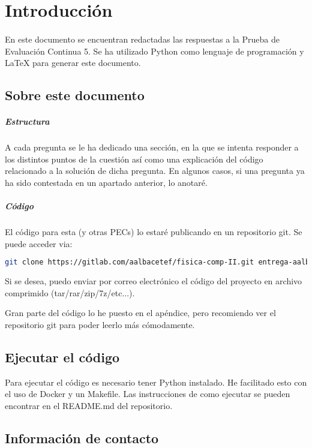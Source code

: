 %
%

\section{Introducción}

\paragraph{}
En este documento se encuentran redactadas las respuestas a la Prueba de Evaluación Continua 5. Se ha utilizado Python como lenguaje de programación y LaTeX para generar este documento.

\subsection{Sobre este documento}

\subparagraph{Estructura}
A cada pregunta se le ha dedicado una sección, en la que se intenta responder a los distintos puntos de la cuestión así como una explicación del código relacionado a la solución de dicha pregunta. En algunos casos, si una pregunta ya ha sido contestada en un apartado anterior, lo anotaré. 

\subparagraph{Código}
El código para esta (y otras PECs) lo estaré publicando en un repositorio git. Se puede acceder via:

\begin{lstlisting}[language=bash]
	git clone https://gitlab.com/aalbacetef/fisica-comp-II.git entrega-aalbacetef-fc-ii
\end{lstlisting}


Si se desea, puedo enviar por correo electrónico el código del proyecto en archivo comprimido (tar/rar/zip/7z/etc...).

Gran parte del código lo he puesto en el apéndice, pero recomiendo ver el repositorio git para poder leerlo más cómodamente.


\subsection{Ejecutar el código}

Para ejecutar el código es necesario tener Python instalado. He facilitado esto con el uso de Docker y un Makefile. Las instrucciones de como ejecutar se pueden encontrar en el README.md del repositorio.

\subsection{Información de contacto}

